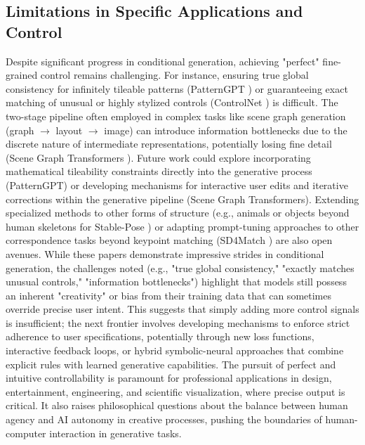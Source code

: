 \documentclass[a4paper]{article}
\begin{document}
\subsection{Limitations in Specific Applications and Control}
Despite significant progress in conditional generation, achieving "perfect" fine-grained control remains challenging. For instance, ensuring true global consistency for infinitely tileable patterns (PatternGPT \cite{Riso2024StructuredPattern}) or guaranteeing exact matching of unusual or highly stylized controls (ControlNet \cite{Zhang2023ControlNet}) is difficult. The two-stage pipeline often employed in complex tasks like scene graph generation (graph $\rightarrow$ layout $\rightarrow$ image) can introduce information bottlenecks due to the discrete nature of intermediate representations, potentially losing fine detail (Scene Graph Transformers \cite{Sortino2023TransformerSceneGraphs}). Future work could explore incorporating mathematical tileability constraints directly into the generative process (PatternGPT) or developing mechanisms for interactive user edits and iterative corrections within the generative pipeline (Scene Graph Transformers). Extending specialized methods to other forms of structure (e.g., animals or objects beyond human skeletons for Stable-Pose \cite{Wang2024StablePose}) or adapting prompt-tuning approaches to other correspondence tasks beyond keypoint matching (SD4Match \cite{Li2023SD4Match}) are also open avenues. While these papers demonstrate impressive strides in conditional generation, the challenges noted (e.g., "true global consistency," "exactly matches unusual controls," "information bottlenecks") highlight that models still possess an inherent "creativity" or bias from their training data that can sometimes override precise user intent. This suggests that simply adding more control signals is insufficient; the next frontier involves developing mechanisms to enforce strict adherence to user specifications, potentially through new loss functions, interactive feedback loops, or hybrid symbolic-neural approaches that combine explicit rules with learned generative capabilities. The pursuit of perfect and intuitive controllability is paramount for professional applications in design, entertainment, engineering, and scientific visualization, where precise output is critical. It also raises philosophical questions about the balance between human agency and AI autonomy in creative processes, pushing the boundaries of human-computer interaction in generative tasks.
\end{document}
